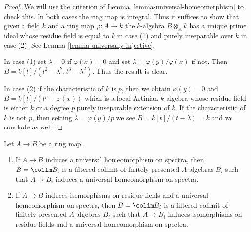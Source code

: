 \begin{proof}
We will use the criterion of Lemma \ref{lemma-universal-homeomorphism}
to check this. In both cases the ring map is integral. Thus it suffices to show
that given a field $k$ and a ring map $\varphi : A \to k$
the $k$-algebra $B \otimes_A k$ has a unique prime ideal
whose residue field is equal to $k$ in case (1) and
purely inseparable over $k$ in case (2). See
Lemma \ref{lemma-universally-injective}.

\medskip\noindent
In case (1) set $\lambda = 0$ if $\varphi(x) = 0$ and set
$\lambda = \varphi(y)/\varphi(x)$ if not. Then
$B = k[t]/(t^2 - \lambda^2, t^3 - \lambda^2)$.
Thus the result is clear.

\medskip\noindent
In case (2) if the characteristic of $k$ is $p$, then
we obtain $\varphi(y) = 0$ and $B = k[t]/(t^p - \varphi(x))$
which is a local Artinian $k$-algebra whose residue field
is either $k$ or a degree $p$ purely inseparable extension of $k$.
If the characteristic of $k$ is not $p$, then setting
$\lambda = \varphi(y)/p$ we see $B = k[t]/(t - \lambda) = k$
and we conclude as well.
\end{proof}

\begin{lemma}
\label{lemma-universal-homeo-limit}
Let $A \to B$ be a ring map.
\begin{enumerate}
\item If $A \to B$ induces a universal homeomorphism on spectra,
then $B = \colim B_i$ is a filtered colimit of finitely presented $A$-algebras
$B_i$ such that $A \to B_i$ induces a universal homeomorphism on spectra.
\item If $A \to B$ induces isomorphisms on residue fields and
a universal homeomorphism on spectra, then $B = \colim B_i$ is a
filtered colimit of finitely presented $A$-algebras $B_i$ such that
$A \to B_i$ induces isomorphisms on residue fields and a
universal homeomorphism on spectra.
\end{enumerate}
\end{lemma}

